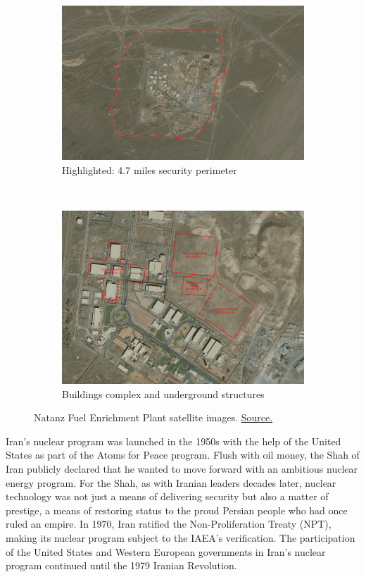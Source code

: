 \documentclass[12pt]{article}
\begin{document}
\begin{figure}[ht!]
    \centering
    \begin{subfigure}[t]{0.5\textwidth}
        \centering
        \includegraphics[height=0.65\textwidth]{natanz1.jpg}
        \caption{Highlighted: 4.7 miles security perimeter}
    \end{subfigure}%
    ~ 
    \begin{subfigure}[t]{0.5\textwidth}
        \centering
        \includegraphics[height=0.65\textwidth]{natanz2.jpg}
        \caption{Buildings complex and underground structures}
    \end{subfigure}
    \caption{Natanz Fuel Enrichment Plant satellite images. \href{https://publicintelligence.net/iran-nuclear-site-natanz-uranium-enrichment-site/}{Source.}}
\end{figure}

Iran's nuclear program was launched in the 1950s with the help of the United States as part of the Atoms for Peace program. Flush with oil money, the Shah of Iran publicly declared that he wanted to move forward with an ambitious nuclear energy program. For the Shah, as with Iranian leaders decades later, nuclear technology was not just a means of delivering security but also a matter of prestige, a means of restoring status to the proud Persian people who had once ruled an empire.  
In 1970, Iran ratified the Non-Proliferation Treaty (NPT), making its nuclear program subject to the IAEA's verification. The participation of the United States and Western European governments in Iran's nuclear program continued until the 1979 Iranian Revolution.
\end{document}
